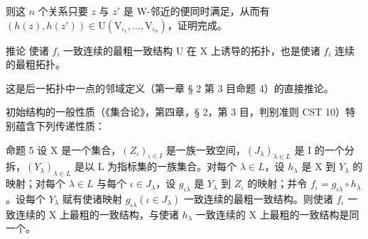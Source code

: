 则这 \(n\) 个关系只要 \(z\) 与 \(z'\) 是 W-邻近的便同时满足，从而有 \((h(z), h(z')) \in \mathrm{U}(\mathrm{V}_{\iota_1}, \ldots, \mathrm{V}_{\iota_n})\)，证明完成。

推论 使诸 \(f_{i}\) 一致连续的最粗一致结构 U 在 X 上诱导的拓扑，也是使诸 \(f_{i}\) 连续的最粗拓扑。

这是后一拓扑中一点的邻域定义（第一章 § 2 第 3 目命题 4）的直接推论。

初始结构的一般性质（《集合论》，第四章，§ 2，第 3 目，判别准则 CST 10）特别蕴含下列传递性质：

命题 5 设 X 是一个集合，\((Z_{\iota})_{\iota \in I}\) 是一族一致空间，\((J_{\lambda})_{\lambda \in L}\) 是 I 的一个分拆，\((Y_{\lambda})_{\lambda \in L}\) 是以 L 为指标集的一族集合。对每个 \(\lambda \in L\)，设 \(h_{\lambda}\) 是 X 到 \(Y_{\lambda}\) 的映射；对每个 \(\lambda \in L\) 与每个 \(\iota \in J_{\lambda}\)，设 \(g_{\iota \lambda}\) 是 \(Y_{\lambda}\) 到 \(Z_{\iota}\) 的映射；并令 \(f_{\iota} = g_{\iota \lambda} \circ h_{\lambda}\)。设每个 \(Y_{\lambda}\) 赋有使诸映射 \(g_{\iota \lambda} (\iota \in J_{\lambda})\) 一致连续的最粗一致结构。则使诸 \(f_{\iota}\) 一致连续的 X 上最粗的一致结构，与使诸 \(h_{\lambda}\) 一致连续的 X 上最粗的一致结构是同一个。

